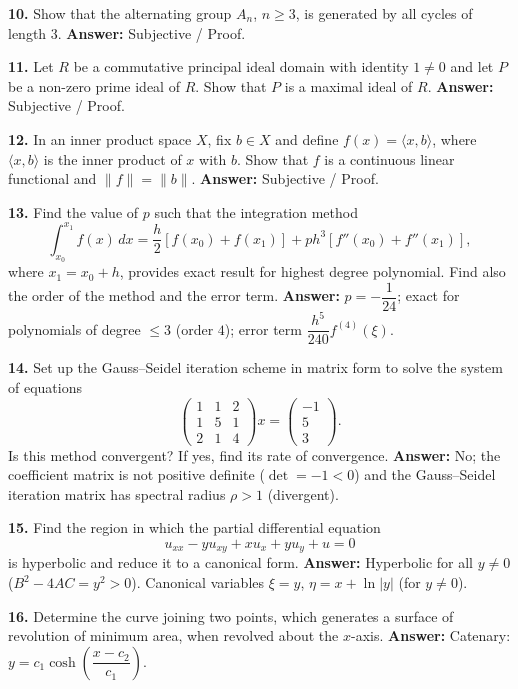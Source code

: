 \documentclass[11pt,a4paper]{article}
\newcommand{\ans}[1]{\textbf{Answer:} #1\par\medskip}
\begin{document}
\textbf{10.} Show that the alternating group $A_n$, $n \ge 3$, is generated by all cycles of length $3$.
\ans{Subjective / Proof.}

\textbf{11.} Let $R$ be a commutative principal ideal domain with identity $1 \ne 0$ and let $P$ be a non-zero prime ideal of $R$. Show that $P$ is a maximal ideal of $R$.
\ans{Subjective / Proof.}

\textbf{12.} In an inner product space $X$, fix $b \in X$ and define $f(x) = \langle x, b \rangle$, where $\langle x, b \rangle$ is the inner product of $x$ with $b$. Show that $f$ is a continuous linear functional and $\|f\| = \|b\|$.
\ans{Subjective / Proof.}

\textbf{13.} Find the value of $p$ such that the integration method
\[
  \int_{x_0}^{x_1} f(x)\,dx = \frac{h}{2}[f(x_0) + f(x_1)] + p h^3[f''(x_0) + f''(x_1)],
\]
where $x_1 = x_0 + h$, provides exact result for highest degree polynomial. Find also the order of the method and the error term.
\ans{$p = -\dfrac{1}{24}$; exact for polynomials of degree $\le 3$ (order $4$); error term $\dfrac{h^5}{240}f^{(4)}(\xi)$.}

\textbf{14.} Set up the Gauss--Seidel iteration scheme in matrix form to solve the system of equations
\[
  \begin{pmatrix}
    1 & 1 & 2 \\
    1 & 5 & 1 \\
    2 & 1 & 4
  \end{pmatrix} x =
  \begin{pmatrix}
    -1 \\ 5 \\ 3
  \end{pmatrix}.
\]
Is this method convergent? If yes, find its rate of convergence.
\ans{No; the coefficient matrix is not positive definite ($\det = -1 < 0$) and the Gauss--Seidel iteration matrix has spectral radius $\rho > 1$ (divergent).}

\textbf{15.} Find the region in which the partial differential equation
\[
  u_{xx} - y u_{xy} + x u_x + y u_y + u = 0
\]
is hyperbolic and reduce it to a canonical form.
\ans{Hyperbolic for all $y \ne 0$ ($B^2 - 4AC = y^2 > 0$). Canonical variables $\xi = y$, $\eta = x + \ln|y|$ (for $y \ne 0$).}

\textbf{16.} Determine the curve joining two points, which generates a surface of revolution of minimum area, when revolved about the $x$-axis.
\ans{Catenary: $y = c_1 \cosh\!\left(\dfrac{x - c_2}{c_1}\right)$.}
\end{document}
